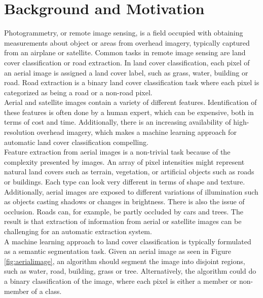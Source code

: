 \section{Background and Motivation}\label{cit}
\label{sec:BackgroundAndMotivation}
Photogrammetry, or remote image sensing, is a field occupied with obtaining measurements about object or areas from overhead imagery, typically captured from an airplane or satellite. Common tasks in remote image sensing are land cover classification or road extraction. In land cover classification, each pixel of an aerial image is assigned a land cover label, such as grass, water, building or road. Road extraction is a binary land cover classification task where each pixel is categorized as being a road or a non-road pixel.\\


Aerial and satellite images contain a variety of different features. Identification of these features is often done by a human expert, which can be expensive, both in terms of cost and time. Additionally, there is an increasing availability of high-resolution overhead imagery, which makes a machine learning approach for automatic land cover classification compelling. \\

Feature extraction from aerial images is a non-trivial task because of the complexity presented by images. An array of pixel intensities might represent natural land covers such as terrain, vegetation, or artificial objects such as roads or buildings. Each type can look very different in terms of shape and texture. Additionally, aerial images are exposed to different variations of illumination such as objects casting shadows or changes in brightness. There is also the issue of occlusion. Roads can, for example, be partly occluded by cars and trees. The result is that extraction of information from aerial or satellite images can be challenging for an automatic extraction system. \\

A machine learning approach to land cover classification is typically formulated as a semantic segmentation task. Given an aerial image as seen in Figure \ref{fig:aerialimage}, an algorithm should segment the image into disjoint regions, such as water, road, building, grass or tree. Alternatively, the algorithm could do a binary classification of the image, where each pixel is either a member or non-member of a class.\\

